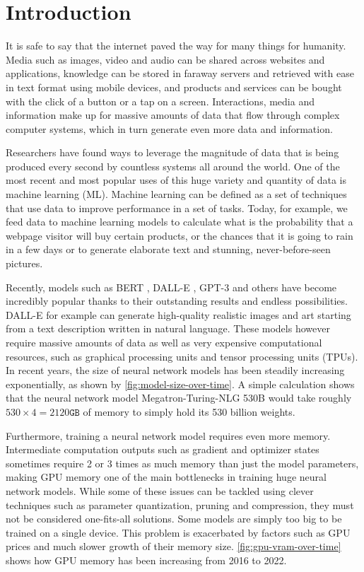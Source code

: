 
\chapter{Introduction}\label{chapter:introduction}

It is safe to say that the internet paved the way for many things for humanity.
Media such as images, video and audio can be shared across websites and applications, knowledge can be stored in faraway servers and retrieved with ease in text format using mobile devices, and products and services can be bought with the click of a button or a tap on a screen.
Interactions, media and information make up for massive amounts of data that flow through complex computer systems, which in turn generate even more data and information.

Researchers have found ways to leverage the magnitude of data that is being produced every second by countless systems all around the world.
One of the most recent and most popular uses of this huge variety and quantity of data is machine learning (ML).
Machine learning can be defined as a set of techniques that use data to improve performance in a set of tasks.
Today, for example, we feed data to machine learning models to calculate what is the probability that a webpage visitor will buy certain products, or the chances that it is going to rain in a few days or to generate elaborate text and stunning, never-before-seen pictures.

Recently, models such as BERT \cite{devlin2018bert}, DALL-E \cite{ramesh2021zero}, GPT-3 \cite{brown2020gpt3} and others have become incredibly popular thanks to their outstanding results and endless possibilities.
DALL-E for example can generate high-quality realistic images and art starting from a text description written in natural language.
These models however require massive amounts of data as well as very expensive computational resources, such as graphical processing units and tensor processing units (TPUs).
In recent years, the size of neural network models has been steadily increasing exponentially, as shown by \autoref{fig:model-size-over-time}.
A simple calculation shows that the neural network model Megatron-Turing-NLG 530B \cite{smith2022megatronturingnlg} would take roughly $530 \times 4 = 2120\texttt{GB}$ of memory to simply hold its 530 billion weights.

Furthermore, training a neural network model requires even more memory.
Intermediate computation outputs such as gradient and optimizer states sometimes require 2 or 3 times as much memory than just the model parameters, making GPU memory one of the main bottlenecks in training huge neural network models.
While some of these issues can be tackled using clever techniques such as parameter quantization, pruning and compression, they must not be considered one-fits-all solutions.
Some models are simply too big to be trained on a single device.
This problem is exacerbated by factors such as GPU prices and much slower growth of their memory size.
\autoref{fig:gpu-vram-over-time} shows how GPU memory has been increasing from 2016 to 2022.

